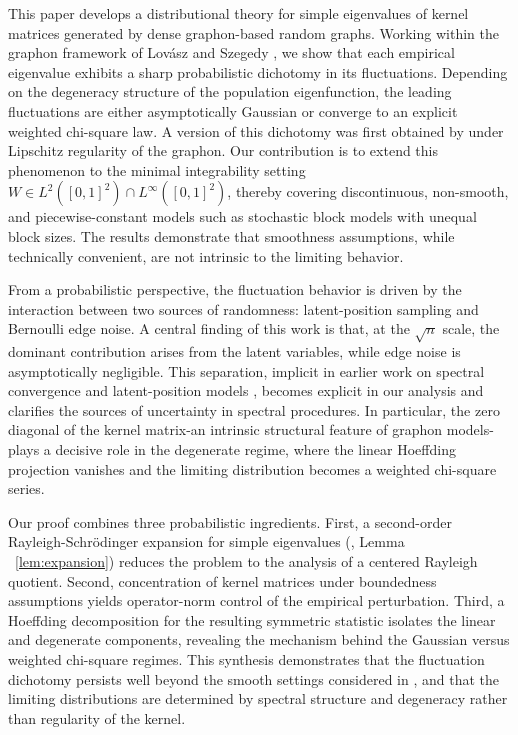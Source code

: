 \documentclass[11pt]{article}
\theoremstyle{plain}
\theoremstyle{remark}
\begin{document}
This paper develops a distributional theory for simple eigenvalues of kernel matrices generated by dense graphon-based random graphs. Working within the graphon framework of Lovász and Szegedy \cite{lovasz2006limits,lovasz2012large,borgs2008convergent,borgs2012convergent}, we show that each empirical eigenvalue exhibits a sharp probabilistic dichotomy in its fluctuations. Depending on the degeneracy 
structure of the population eigenfunction, the leading fluctuations are either asymptotically 
Gaussian or converge to an explicit weighted chi-square law. A version of this dichotomy was first obtained by \cite{chatterjee2025fluctuation} under Lipschitz regularity of the graphon. Our contribution is to extend this phenomenon to the minimal integrability setting 
$W\in L^2([0,1]^2)\cap L^\infty([0,1]^2)$, thereby covering discontinuous, non-smooth, and 
piecewise-constant models such as stochastic block models with unequal block sizes. The results 
demonstrate that smoothness assumptions, while technically convenient, are not intrinsic to the 
limiting behavior.

From a probabilistic perspective, the fluctuation behavior is driven by the interaction between 
two sources of randomness: latent-position sampling and Bernoulli edge noise. A central finding 
of this work is that, at the $\sqrt{n}$ scale, the dominant contribution arises from the latent 
variables, while edge noise is asymptotically negligible. This separation, implicit in earlier 
work on spectral convergence \cite{koltchinskii2000random} and latent-position 
models \cite{lei2015consistency,abbe2017community,athreya2018statistical}, becomes explicit in 
our analysis and clarifies the sources of uncertainty in spectral procedures. In particular, the 
zero diagonal of the kernel matrix-an intrinsic structural feature of graphon models-plays a 
decisive role in the degenerate regime, where the linear Hoeffding projection vanishes and the 
limiting distribution becomes a weighted chi-square series.

Our proof combines three probabilistic ingredients. First, a second-order Rayleigh-Schrödinger expansion for simple eigenvalues (\cite{kato1966perturbation}, Lemma ~\ref{lem:expansion}) reduces the problem to the analysis 
of a centered Rayleigh quotient. Second, concentration of kernel matrices under boundedness 
assumptions yields operator-norm control of the empirical perturbation. Third, a Hoeffding 
decomposition for the resulting symmetric statistic \cite{serfling2009approximation} isolates the 
linear and degenerate components, revealing the mechanism behind the Gaussian versus weighted 
chi-square regimes. This synthesis demonstrates that the fluctuation dichotomy persists well beyond the smooth settings considered in \cite{chatterjee2025fluctuation}, and that the limiting distributions 
are determined by spectral structure and degeneracy rather than regularity of the kernel.
\end{document}
